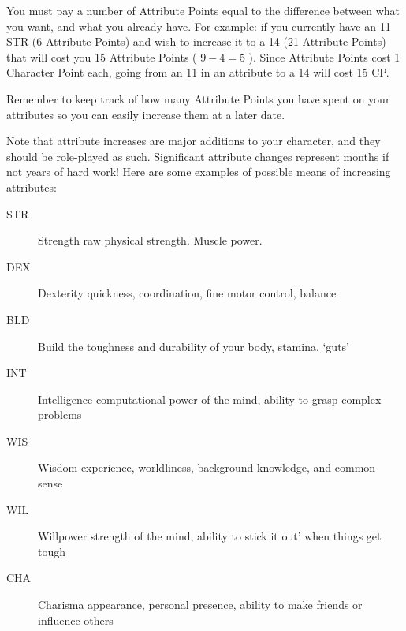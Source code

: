 \documentclass[twoside]{book}
\begin{document}
    {  
     You must pay a number of Attribute Points equal to
              the difference between what you want, and what you already
              have. For example: if you currently have an 11 STR (6
              Attribute Points) and wish to increase it to a 14 (21
              Attribute Points) that will cost you 15 Attribute Points (
              \begin{math} 9  -  4  =
               5 \end{math} ). Since Attribute Points cost
              1 Character Point each, going from an 11 in an attribute to
              a 14 will cost 15 CP.
            
    }
  
    {  
     Remember to keep track of how many Attribute Points
               you have spent on your attributes so you can easily
               increase them at a later date. 
    }
  
    {  
     Note that attribute increases are major additions to
               your character, and they should be role-played as such.
               Significant attribute changes represent months if not
               years of hard work! Here are some examples of possible
               means of increasing attributes: 
    }
  
\begin{description}
    
  \item[ STR ] 
    {  
      Strength raw physical strength. Muscle power.
                   
    }
  
  \item[ DEX ] 
    {  
     Dexterity quickness, coordination, fine motor
                   control, balance 
    }
  
  \item[ BLD ] 
    {  
     Build the toughness and durability of your body,
                   stamina, `guts' 
    }
  
  \item[ INT ] 
    {  
     Intelligence computational power of the mind,
                   ability to grasp complex problems 
    }
  
  \item[ WIS ] 
    {  
     Wisdom experience, worldliness, background
                   knowledge, and common sense 
    }
  
  \item[ WIL ] 
    {  
     Willpower strength of the mind, ability to
                   stick it out' when things get tough
                   
    }
  
  \item[ CHA ] 
    {  
     Charisma appearance, personal presence, ability
                   to make friends or influence others 
    }
  
\end{description}
  
\end{document}
